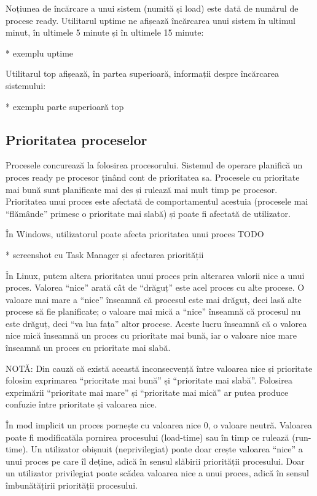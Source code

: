 Noțiunea de încărcare a unui sistem (numită și load) este dată de numărul de
procese ready. Utilitarul uptime ne afișează încărcarea unui sistem în ultimul
minut, în ultimele 5 minute și în ultimele 15 minute:

* exemplu uptime

Utilitarul top afișează, în partea superioară, informații despre încărcarea
sistemului:

* exemplu parte superioară top

\subsection{Prioritatea proceselor}
\label{sec:procese-resurse-prioritate}

Procesele concurează la folosirea procesorului. Sistemul de operare planifică un
proces ready pe procesor ținând cont de prioritatea sa. Procesele cu prioritate
mai bună sunt planificate mai des și rulează mai mult timp pe procesor.
Prioritatea unui proces este afectată de comportamentul acestuia (procesele mai
“flămânde” primesc o prioritate mai slabă) și poate fi afectată de utilizator.

În Windows, utilizatorul poate afecta prioritatea unui proces TODO

* screenshot cu Task Manager și afectarea priorității

În Linux, putem altera prioritatea unui proces prin alterarea valorii nice a
unui proces. Valorea “nice” arată cât de “drăguț” este acel proces cu alte
procese. O valoare mai mare a “nice” înseamnă că procesul este mai drăguț, deci
lasă alte procese să fie planificate; o valoare mai mică a “nice” înseamnă că
procesul nu este drăguț, deci “va lua fața” altor procese. Aceste lucru înseamnă
că o valorea nice mică înseamnă un proces cu prioritate mai bună, iar o valoare
nice mare înseamnă un proces cu prioritate mai slabă.

NOTĂ: Din cauză că există această inconsecvență între valoarea nice și
prioritate folosim exprimarea “prioritate mai bună” și “prioritate mai slabă”.
Folosirea exprimării “prioritate mai mare” și “prioritate mai mică” ar putea
produce confuzie între prioritate și valoarea nice.

În mod implicit un proces pornește cu valoarea nice 0, o valoare neutră.
Valoarea poate fi modificatăla pornirea procesului (load-time) sau în timp ce
rulează (run-time). Un utilizator obișnuit (neprivilegiat) poate doar crește
valoarea “nice” a unui proces pe care îl deține, adică în sensul slăbirii
priorității procesului. Doar un utilizator privilegiat poate scădea valoarea
nice a unui proces, adică în sensul îmbunătățirii priorității procesului.

